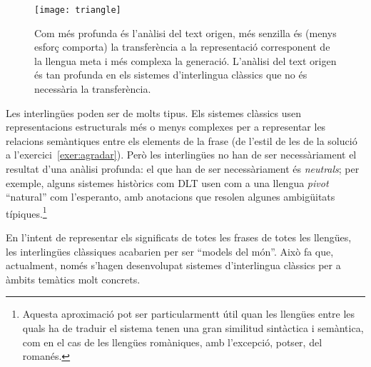 \begin{figure}
\begin{center}
\texttt{[image: triangle]}
\end{center}
\caption{Com més profunda és l'anàlisi del text origen, més senzilla
  és (menys esforç comporta) la transferència a la representació
  corresponent de la llengua meta i més complexa la generació.
  L'anàlisi del text origen és tan profunda en els sistemes
  d'interlingua clàssics que no és necessària la transferència.}
\label{fg:triangle}
\end{figure}

Les interlingües poden ser de molts tipus. Els sistemes clàssics usen
representacions estructurals més o menys complexes per a representar
les relacions semàntiques entre els elements de la frase (de l'estil
de les de la solució a l'exercici~\ref{exer:agradar}).  Però les
interlingües no han de ser necessàriament el resultat d'una anàlisi
profunda: el que han de ser necessàriament és \emph{neutrals}; per
exemple, alguns sistemes històrics com DLT
\citep[cap.~17]{hutchins92b} usen com a una llengua \emph{pivot}
``natural'' com l'esperanto, amb anotacions que resolen algunes
ambigüitats típiques.\footnote{Aquesta aproximació pot ser
  particularmentt útil quan les llengües entre les quals ha de traduir
  el sistema tenen una gran similitud sintàctica i semàntica, com en
  el cas de les llengües romàniques, amb l'excepció, potser, del
  romanés.}

En l'intent de representar els significats de totes les frases de
totes les llengües, les interlingües clàssiques acabarien per ser
``models del món''. Això fa que, actualment, només s'hagen
desenvolupat sistemes d'interlingua clàssics per a àmbits temàtics
molt concrets.

